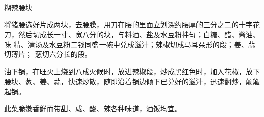 \begin{recipe}[宫保腰块]{糊辣腰块}

\ingredients


\preparation

\step 将猪腰选好片成两块，去腰臊，用刀在腰的里面立划深约腰厚的三分之二的十字花
刀，然后切成长一寸、宽八分的块，与料酒、盐及水豆粉拌匀；白糖、醋、酱油、味
精、清汤及水豆粉二钱同盛一碗中兑成滋汁；辣椒切成马耳朵形的段；姜、蒜切薄片；
葱切六分长的段。

\step 油下锅，在旺火上烧到八成火候时，放进辣椒段，炒成黑红色时，加入花椒，放下
腰块、葱、姜、蒜，快速炒散，随即沿着锅边倾下已兑好的滋汁，迅速翻炒，颠簸起锅。

\features

此菜脆嫩香鲜而带甜、咸、酸、辣各种味道，酒饭均宜。

\end{recipe}

